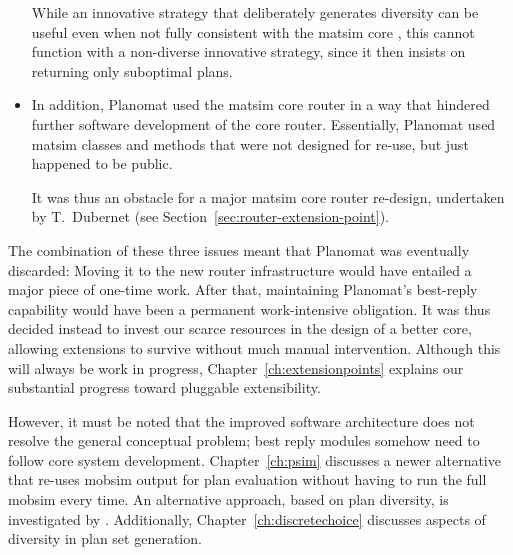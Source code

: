 \begin{itemize}
While an innovative strategy that deliberately generates diversity can be useful even when not fully consistent with the \gls{matsim} core \citep{NagelKickhoeferJoubert2014HeterogeneousVoTsPROCEDIA}, this cannot function with a non-diverse innovative strategy, since it then insists on returning only suboptimal plans.
%
\item In addition, Planomat used the \gls{matsim} core router in a way that hindered further software development of the core router. Essentially, Planomat used \gls{matsim} classes and methods that were not designed for re-use, but just happened to be public.

It was thus an obstacle for a major \gls{matsim} core router re-design, undertaken by T.~Dubernet (see Section~\ref{sec:router-extension-point}).
\end{itemize}

The combination of these three issues meant that Planomat was eventually discarded: Moving it to the new router infrastructure would have entailed a major piece of one-time work. After that, maintaining Planomat's best-reply capability would have been a permanent work-intensive obligation. It was thus decided instead to invest our scarce resources in the design of a better core, allowing extensions to survive without much manual intervention. Although this will always be work in progress, Chapter~\ref{ch:extensionpoints} explains our substantial progress toward pluggable extensibility.

However, it must be noted that the improved software architecture does not resolve the general conceptual problem; best reply modules somehow need to follow core system development. Chapter~\ref{ch:psim} discusses a newer alternative that re-uses \gls{mobsim} output for plan evaluation without having to run the full \gls{mobsim} every time. An alternative approach, based on plan diversity, is investigated by \cite{NagelKickhoeferJoubert2014HeterogeneousVoTsPROCEDIA}. Additionally, Chapter~\ref{ch:discretechoice} discusses aspects of diversity in plan set generation.


